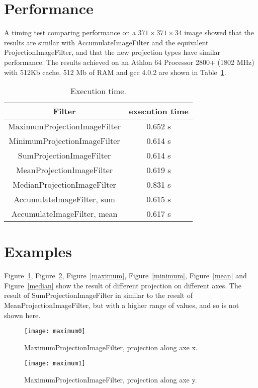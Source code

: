 \documentclass{InsightArticle}
\begin{document}
\section{Performance}

A timing test comparing performance on a $371 \times 371 \times 34$
image showed that the results are similar with AccumulateImageFilter
and the equivalent ProjectionImageFilter, and that the new projection
types have similar performance. The results achieved on an Athlon 64 
Processor 2800+ (1802 MHz) with 512Kb cache, 512 Mb of RAM and gcc
4.0.2 are shown in Table~\ref{perf}.

\begin{table}[htbp]
\centering
\begin{tabular}{cc}
\hline
Filter & execution time \\
\hline
\hline
MaximumProjectionImageFilter & 0.652 s \\
MinimumProjectionImageFilter  & 0.614 s\\
SumProjectionImageFilter  & 0.614 s\\
MeanProjectionImageFilter  & 0.619 s\\
MedianProjectionImageFilter  & 0.831 s\\
AccumulateImageFilter, sum  & 0.615 s\\
AccumulateImageFilter, mean  & 0.617 s\\
\hline
\end{tabular}
\caption{Execution time.\label{perf}}
\end{table}

\section{Examples}
Figure~\ref{maximum0}, Figure~\ref{maximum1}, Figure~\ref{maximum},
Figure~\ref{minimum}, Figure~\ref{mean} and Figure~\ref{median} show the result
of different projection on different axes. The result of
SumProjectionImageFilter in similar to the result of MeanProjectionImageFilter,
but with a higher range of values, and so is not shown here.

\begin{figure}[htbp]
\centering
\texttt{[image: maximum0]}
\caption{MaximumProjectionImageFilter, projection along axe x.\label{maximum0}}
\end{figure}

\begin{figure}[htbp]
\centering
\texttt{[image: maximum1]}
\caption{MaximumProjectionImageFilter, projection along axe y.\label{maximum1}}
\end{figure}
\end{document}
